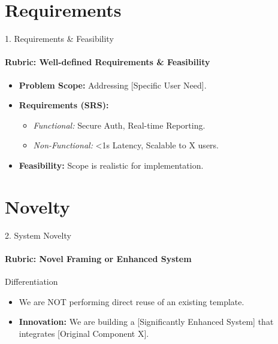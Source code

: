 \documentclass[aspectratio=169, 11pt]{beamer}
\begin{document}
\section{Requirements}
\begin{frame}{1. Requirements \& Feasibility}
    \framesubtitle{Rubric: Well-defined Requirements \& Feasibility}
    \begin{itemize}
        \item \textbf{Problem Scope:} Addressing [Specific User Need].
        \item \textbf{Requirements (SRS):}
        \begin{itemize}
            \item \textit{Functional:} Secure Auth, Real-time Reporting.
            \item \textit{Non-Functional:} <1s Latency, Scalable to X users.
        \end{itemize}
        \item \textbf{Feasibility:} Scope is realistic for implementation.
    \end{itemize}
\end{frame}

\section{Novelty}
\begin{frame}{2. System Novelty}
    \framesubtitle{Rubric: Novel Framing or Enhanced System}
    \begin{block}{Differentiation}
        \begin{itemize}
            \item We are NOT performing direct reuse of an existing template.
            \item \textbf{Innovation:} We are building a [Significantly Enhanced System] that integrates [Original Component X].
        \end{itemize}
    \end{block}
\end{frame}

\end{document}
